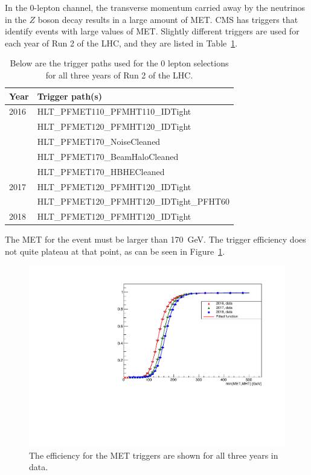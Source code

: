 In the 0-lepton channel, the transverse momentum carried away by the neutrinos
in the $Z$ boson decay results in a large amount of MET.
CMS has triggers that identify events with large values of MET.
Slightly different triggers are used for each year of Run 2 of the LHC,
and they are listed in Table~\ref{tab:0-triggers}.
\begin{table}
  \centering
  \caption[Triggers for the 0 lepton selection]{
    Below are the trigger paths used for the 0 lepton selections
    for all three years of Run 2 of the LHC.
  }
  \begin{tabular}{|l|l|}
    \hline
    Year & Trigger path(s) \\
    \hline
    2016 & HLT\_PFMET110\_PFMHT110\_IDTight \\
    & HLT\_PFMET120\_PFMHT120\_IDTight \\
    & HLT\_PFMET170\_NoiseCleaned \\
    & HLT\_PFMET170\_BeamHaloCleaned \\
    & HLT\_PFMET170\_HBHECleaned \\
    \hline
    2017 & HLT\_PFMET120\_PFMHT120\_IDTight \\
    & HLT\_PFMET120\_PFMHT120\_IDTight\_PFHT60 \\
    \hline
    2018 & HLT\_PFMET120\_PFMHT120\_IDTight \\
    \hline
  \end{tabular}
  \label{tab:0-triggers}
\end{table}
The MET for the event must be larger than \SI{170}{GeV}.
The trigger efficiency does not quite plateau at that point,
as can be seen in Figure~\ref{fig:0-lep-trigger-eff}.
\begin{figure}
  \centering
  \includegraphics[width=1.0\linewidth]{figures/CompData3Years.pdf}
  \caption[Efficiency for MET trigger in data]{
    The efficiency for the MET triggers are shown for all three years in data.
  }
  \label{fig:0-lep-trigger-eff}
\end{figure}
